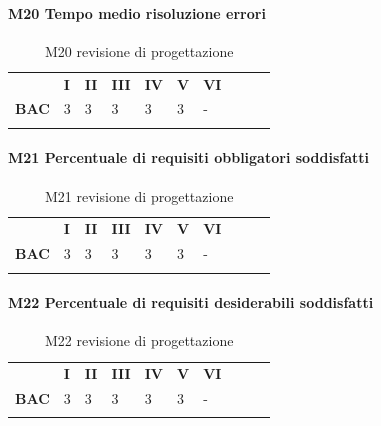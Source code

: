\paragraph{M20 Tempo medio risoluzione errori} \mbox{}
\begin{longtable}[H!] {						
		>{}p{50mm}  		
		>{}p{8mm}
		>{}p{8mm}		
		>{}p{8mm}		
		>{}p{8mm}		
		>{}p{8mm}		
		>{}p{8mm}
		>{}p{8mm}
		>{}p{8mm}
		>{}p{8mm}
	}
	\rowcolor{gray!50}
	\textbf{} & \textbf{I} & \textbf{II} & \textbf{III} & \textbf{IV} & \textbf{V} & \textbf{VI} \TBstrut \\ [2mm]
	\textbf{BAC} & 3 & 3 & 3 & 3 & 3 & - \TBstrut \\ [2mm]
	\rowcolor{white}
	\caption{M20 revisione di progettazione}
\end{longtable}
\paragraph{M21 Percentuale di requisiti obbligatori soddisfatti} \mbox{}
\begin{longtable}[H!] {						
		>{}p{50mm}  		
		>{}p{8mm}
		>{}p{8mm}		
		>{}p{8mm}		
		>{}p{8mm}		
		>{}p{8mm}		
		>{}p{8mm}
		>{}p{8mm}
		>{}p{8mm}
		>{}p{8mm}
	}
	\rowcolor{gray!50}
	\textbf{} & \textbf{I} & \textbf{II} & \textbf{III} & \textbf{IV} & \textbf{V} & \textbf{VI} \TBstrut \\ [2mm]
	\textbf{BAC} & 3 & 3 & 3 & 3 & 3 & - \TBstrut \\ [2mm]
	\rowcolor{white}
	\caption{M21 revisione di progettazione}
\end{longtable}
\paragraph{M22 Percentuale di requisiti desiderabili soddisfatti} \mbox{}
\begin{longtable}[H!] {						
		>{}p{50mm}  		
		>{}p{8mm}
		>{}p{8mm}		
		>{}p{8mm}		
		>{}p{8mm}		
		>{}p{8mm}		
		>{}p{8mm}
		>{}p{8mm}
		>{}p{8mm}
		>{}p{8mm}
	}
	\rowcolor{gray!50}
	\textbf{} & \textbf{I} & \textbf{II} & \textbf{III} & \textbf{IV} & \textbf{V} & \textbf{VI} \TBstrut \\ [2mm]
	\textbf{BAC} & 3 & 3 & 3 & 3 & 3 & - \TBstrut \\ [2mm]
	\rowcolor{white}
	\caption{M22 revisione di progettazione}
\end{longtable}
